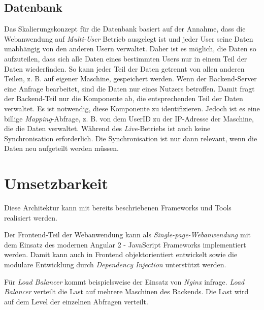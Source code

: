 \subsection{Datenbank}

Das Skalierungskonzept für die Datenbank basiert auf der Annahme, dass die Webanwendung auf \textit{Multi-User} Betrieb ausgelegt ist und jeder User seine Daten unabhängig von den anderen Usern verwaltet. Daher ist es möglich, die Daten so aufzuteilen, dass sich alle Daten eines bestimmten Users nur in einem Teil der Daten wiederfinden. So kann jeder Teil der Daten getrennt von allen anderen Teilen, z. B. auf eigener Maschine, gespeichert werden. Wenn der Backend-Server eine Anfrage bearbeitet, sind die Daten nur eines Nutzers betroffen. Damit fragt der Backend-Teil nur die Komponente ab, die entsprechenden Teil der Daten verwaltet. Es ist notwendig, diese Komponente zu identifizieren. Jedoch ist es eine billige \textit{Mapping}-Abfrage, z. B. von dem UserID zu der IP-Adresse der Maschine, die die Daten verwaltet. Während des \textit{Live}-Betriebs ist auch keine Synchronisation erforderlich. Die Synchronisation ist nur dann relevant, wenn die Daten neu aufgeteilt werden müssen.

\section{Umsetzbarkeit}
Diese Architektur kann mit bereits beschriebenen Frameworks und Tools realisiert werden.

Der Frontend-Teil der Webanwendung kann als \textit{Single-page-Webanwendung} mit dem Einsatz des modernen Angular 2 - JavaScript Frameworks implementiert werden. Damit kann auch in Frontend objektorientiert entwickelt sowie die modulare Entwicklung durch \textit{Dependency Injection} unterstützt werden. 

Für \textit{Load Balancer} kommt beispielsweise der Einsatz von \textit{Nginx} \cite{nginx} infrage. \textit{Load Balancer} verteilt die Last auf mehrere Maschinen des Backends. Die Last wird auf dem Level der einzelnen Abfragen verteilt. 

